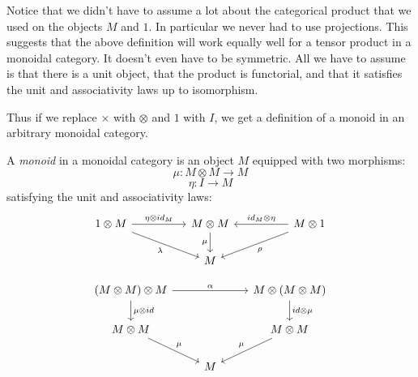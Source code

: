 \documentclass[DaoFP]{subfiles}
\begin{document}
Notice that we didn't have to assume a lot about the categorical product that we used on the objects $M$ and $1$. In particular we never had to use projections. This suggests that the above definition will work equally well for a tensor product in a monoidal category. It doesn't even have to be symmetric. All we have to assume is that there is a unit object, that the product is functorial, and that it satisfies the unit and associativity laws up to isomorphism.

Thus if we replace $\times$ with $\otimes$ and $1$ with $I$, we get a definition of a monoid in an arbitrary monoidal category. 

A \emph{monoid} in a monoidal category is an object $M$ equipped with two morphisms:
\[ \mu \colon M \otimes M \to M \]
\[ \eta \colon I \to M \]
satisfying the unit and associativity laws:
\[
 \begin{tikzcd}
 1 \otimes M
 \arrow[rr, "\eta \otimes id_M"]
 \arrow[rrd, "\lambda"']
& & M \otimes M
 \arrow[d, "\mu"']
&& M \otimes 1
 \arrow[ll, "id_M \otimes \eta"']
 \arrow[lld, "\rho"]
 \\
 && M
  \end{tikzcd}
\]

\[
 \begin{tikzcd}
 (M \otimes M) \otimes M 
 \arrow[rr, "\alpha"]
 \arrow[d, "\mu \otimes id"]
 &&
 M \otimes (M \otimes M)
 \arrow[d, "id \otimes \mu"]
 \\
 M \otimes M 
 \arrow[dr, "\mu"]
& & M \otimes M
 \arrow[dl, "\mu"']
 \\
&  M
 \end{tikzcd}
\]
\end{document}
